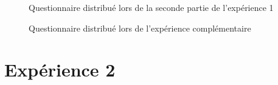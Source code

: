 \documentclass[12pt,fleqn,oneside,french,openany]{book} %
\begin{document}
\clearpage
\begin{figure}[htp] 
	\caption{Questionnaire distribué lors de la seconde partie de l'expérience 1}
\end{figure}

\clearpage
\begin{figure}[htp] 
	\caption{Questionnaire distribué lors de l'expérience complémentaire}
\end{figure}

\clearpage
\section*{Expérience 2}
\end{document}
